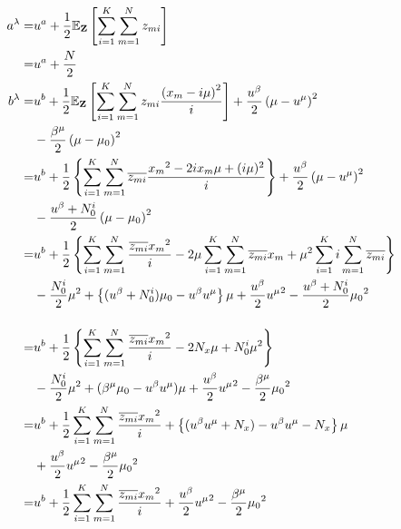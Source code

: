 \begin{align}
  a^\lambda  =&  u^a + \frac{1}{2} \mathbb{E}_{\bf Z}\left[ \sum_{i=1}^K \sum_{m=1}^N z_{mi} \right]  \\
  =&  u^a + \frac{N}{2}  \\
  b^\lambda  =&  u^b + \frac{1}{2} \mathbb{E}_{\bf Z}\left[ \sum_{i=1}^K \sum_{m=1}^N z_{mi} \frac{\left( x_m - i \mu \right)^2}{i} \right]  + \frac{u^\beta}{2} \left( \mu - u^\mu \right)^2  \notag  \\  
    &  - \frac{\beta^\mu}{2} \left( \mu - \mu_{0} \right)^2  \\
%
  =&  u^b + \frac{1}{2} \left\{ \sum_{i=1}^K \sum_{m=1}^N \overline{z_{mi}} \frac{ {x_m}^2 - 2 i x_m \mu + (i \mu)^2}{i}  \right\}  + \frac{u^\beta}{2} \left( \mu - u^\mu \right)^2  \notag  \\  
    &  - \frac{u^\beta + N_0^i}{2} \left( \mu - \mu_{0} \right)^2  \\
%
  =&  u^b + \frac{1}{2} \left\{  
      \sum_{i=1}^K \sum_{m=1}^N \frac{ \overline{z_{mi}} {x_m}^2}{i}  
      - 2 \mu \sum_{i=1}^K \sum_{m=1}^N \overline{z_{mi}} x_m  
      + \mu^2 \sum_{i=1}^K i \sum_{m=1}^N \overline{z_{mi}}  
    \right\}  \notag  \\  
    &  - \frac{N_0^i}{2} \mu^2  + \left\{ (u^\beta + N_0^i) \mu_0 - u^\beta u^\mu \right\} \mu
    + \frac{u^\beta}{2} {u^\mu}^2 - \frac{u^\beta + N_0^i}{2} {\mu_{0}}^2  \\
%
\intertext{}
%
  =&  u^b + \frac{1}{2} \left\{  
      \sum_{i=1}^K \sum_{m=1}^N \frac{ \overline{z_{mi}} {x_m}^2}{i}  -  2 N_x \mu  +  N_0^i \mu^2  \right\}  \notag  \\  
    &  - \frac{N_0^i}{2} \mu^2  + ( \beta^\mu \mu_0 - u^\beta u^\mu ) \mu
    + \frac{u^\beta}{2} {u^\mu}^2 - \frac{\beta^\mu}{2} {\mu_{0}}^2  \\
%
  =&  u^b + \frac{1}{2} \sum_{i=1}^K \sum_{m=1}^N \frac{ \overline{z_{mi}} {x_m}^2}{i}  
      +  \left\{ (u^\beta u^\mu + N_x) - u^\beta u^\mu - N_x \right\} \mu  \notag  \\  
    &  + \frac{u^\beta}{2} {u^\mu}^2 - \frac{\beta^\mu}{2} {\mu_{0}}^2  \\
%
  =&  u^b + \frac{1}{2} \sum_{i=1}^K \sum_{m=1}^N \frac{ \overline{z_{mi}} {x_m}^2}{i}  
    + \frac{u^\beta}{2} {u^\mu}^2 - \frac{\beta^\mu}{2} {\mu_{0}}^2  
\end{align}

